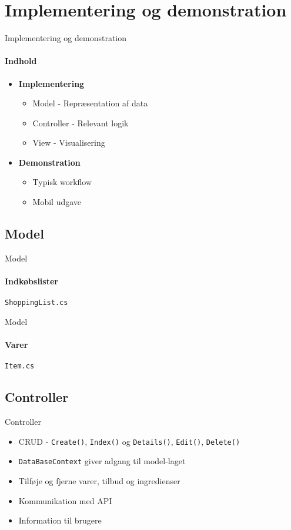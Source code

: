 \section{Implementering og demonstration}
\begin{frame}{Implementering og demonstration}
	\framesubtitle{Indhold}
    \begin{itemize}
    		\item \textbf{Implementering}
    		\begin{itemize}
		\item Model - Repræsentation af data
		\item Controller - Relevant logik
		\item View - Visualisering
        \end{itemize}
        \item \textbf{Demonstration} 
        \begin{itemize}
        \item Typisk workflow        
        \item Mobil udgave  
        \end{itemize}        
    \end{itemize}
\end{frame}

\subsection{Model}
\begin{frame}{Model}
	\framesubtitle{Indkøbslister}
	\texttt{ShoppingList.cs}
		
\end{frame}
\begin{frame}{Model}
	\framesubtitle{Varer}	
	\texttt{Item.cs}
		
\end{frame}

\subsection{Controller}
\begin{frame}{Controller}
	\begin{itemize}
		\item CRUD - \texttt{Create()}, \texttt{Index()} og \texttt{Details()}, \texttt{Edit()}, \texttt{Delete()}
		\item \texttt{DataBaseContext} giver adgang til model-laget
		\vspace{15pt}
		\item Tilføje og fjerne varer, tilbud og ingredienser
		\item Kommunikation med API
		\item Information til brugere
	\end{itemize}
\end{frame}

